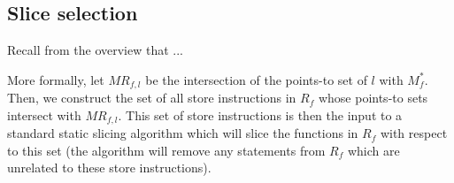 
\subsection{Slice selection}\label{Se:Slicing}

Recall from the overview that ...

More formally, let $MR_{f,l}$ be the intersection of the points-to set
of $l$ with $M^{*}_f$.  Then, we construct the set of all store
instructions in $R_f$ whose points-to sets intersect with $MR_{f,l}$.
This set of store instructions is then the input to a standard
static slicing algorithm which will slice the functions in $R_f$ with
respect to this set (\ie the algorithm will remove any statements from
$R_f$ which are unrelated to these store instructions).

